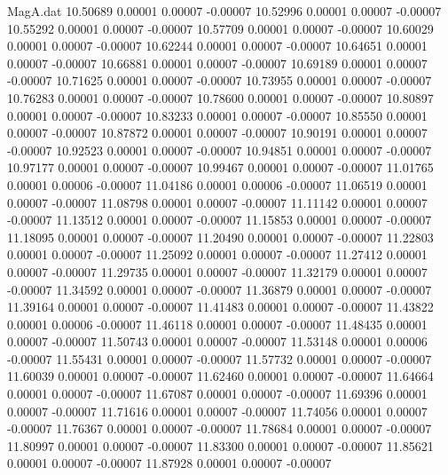 \begin{filecontents}{MagA.dat}
  10.50689    0.00001    0.00007   -0.00007
  10.52996    0.00001    0.00007   -0.00007
  10.55292    0.00001    0.00007   -0.00007
  10.57709    0.00001    0.00007   -0.00007
  10.60029    0.00001    0.00007   -0.00007
  10.62244    0.00001    0.00007   -0.00007
  10.64651    0.00001    0.00007   -0.00007
  10.66881    0.00001    0.00007   -0.00007
  10.69189    0.00001    0.00007   -0.00007
  10.71625    0.00001    0.00007   -0.00007
  10.73955    0.00001    0.00007   -0.00007
  10.76283    0.00001    0.00007   -0.00007
  10.78600    0.00001    0.00007   -0.00007
  10.80897    0.00001    0.00007   -0.00007
  10.83233    0.00001    0.00007   -0.00007
  10.85550    0.00001    0.00007   -0.00007
  10.87872    0.00001    0.00007   -0.00007
  10.90191    0.00001    0.00007   -0.00007
  10.92523    0.00001    0.00007   -0.00007
  10.94851    0.00001    0.00007   -0.00007
  10.97177    0.00001    0.00007   -0.00007
  10.99467    0.00001    0.00007   -0.00007
  11.01765    0.00001    0.00006   -0.00007
  11.04186    0.00001    0.00006   -0.00007
  11.06519    0.00001    0.00007   -0.00007
  11.08798    0.00001    0.00007   -0.00007
  11.11142    0.00001    0.00007   -0.00007
  11.13512    0.00001    0.00007   -0.00007
  11.15853    0.00001    0.00007   -0.00007
  11.18095    0.00001    0.00007   -0.00007
  11.20490    0.00001    0.00007   -0.00007
  11.22803    0.00001    0.00007   -0.00007
  11.25092    0.00001    0.00007   -0.00007
  11.27412    0.00001    0.00007   -0.00007
  11.29735    0.00001    0.00007   -0.00007
  11.32179    0.00001    0.00007   -0.00007
  11.34592    0.00001    0.00007   -0.00007
  11.36879    0.00001    0.00007   -0.00007
  11.39164    0.00001    0.00007   -0.00007
  11.41483    0.00001    0.00007   -0.00007
  11.43822    0.00001    0.00006   -0.00007
  11.46118    0.00001    0.00007   -0.00007
  11.48435    0.00001    0.00007   -0.00007
  11.50743    0.00001    0.00007   -0.00007
  11.53148    0.00001    0.00006   -0.00007
  11.55431    0.00001    0.00007   -0.00007
  11.57732    0.00001    0.00007   -0.00007
  11.60039    0.00001    0.00007   -0.00007
  11.62460    0.00001    0.00007   -0.00007
  11.64664    0.00001    0.00007   -0.00007
  11.67087    0.00001    0.00007   -0.00007
  11.69396    0.00001    0.00007   -0.00007
  11.71616    0.00001    0.00007   -0.00007
  11.74056    0.00001    0.00007   -0.00007
  11.76367    0.00001    0.00007   -0.00007
  11.78684    0.00001    0.00007   -0.00007
  11.80997    0.00001    0.00007   -0.00007
  11.83300    0.00001    0.00007   -0.00007
  11.85621    0.00001    0.00007   -0.00007
  11.87928    0.00001    0.00007   -0.00007

\end{filecontents}
